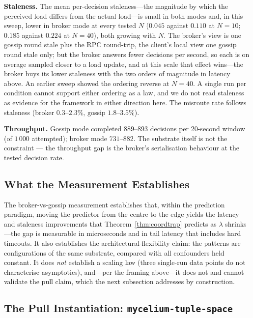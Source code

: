 \documentclass[11pt]{article}
\theoremstyle{definition}
\theoremstyle{plain}
\theoremstyle{plain}
\begin{document}
\textbf{Staleness.} The mean per-decision staleness---the magnitude by which
the perceived load differs from the actual load---is small in both modes and,
in this sweep, lower in broker mode at every tested $N$ ($0.045$ against $0.110$
at $N{=}10$; $0.185$ against $0.224$ at $N{=}40$), both growing with $N$. The
broker's view is one gossip round stale plus the RPC round-trip, the client's
local view one gossip round stale only; but the broker answers fewer decisions
per second, so each is on average sampled closer to a load update, and at this
scale that effect wins---the broker buys its lower staleness with the two
orders of magnitude in latency above. An earlier sweep showed the ordering
reverse at $N{=}40$. A single run per condition cannot support either ordering
as a law, and we do not read staleness as evidence for the framework in either
direction here. The misroute rate follows staleness (broker $0.3$--$2.3\%$,
gossip $1.8$--$3.5\%$).

\textbf{Throughput.} Gossip mode completed $889$--$893$ decisions per
$20$-second window (of $1\,000$ attempted); broker mode $731$--$882$. The substrate
itself is not the constraint — the throughput gap is the broker's
serialisation behaviour at the tested decision rate.

\subsection{What the Measurement Establishes}

The broker-vs-gossip measurement establishes that, within the prediction
paradigm, moving the predictor from the centre to the edge yields the
latency and staleness improvements that Theorem~\ref{thm:coordtrap}
predicts as $\lambda$ shrinks---the gap is measurable in microseconds and
in tail latency that includes hard timeouts. It also establishes the
architectural-flexibility claim: the patterns are configurations of the
same substrate, compared with all confounders held constant. It does
\emph{not} establish a scaling law (three single-run data points do not
characterise asymptotics), and---per the framing above---it does not and
cannot validate the pull claim, which the next subsection addresses by
construction.

\subsection{The Pull Instantiation: \texttt{mycelium-tuple-space}}
\label{sec:pullinstantiation}
\end{document}
